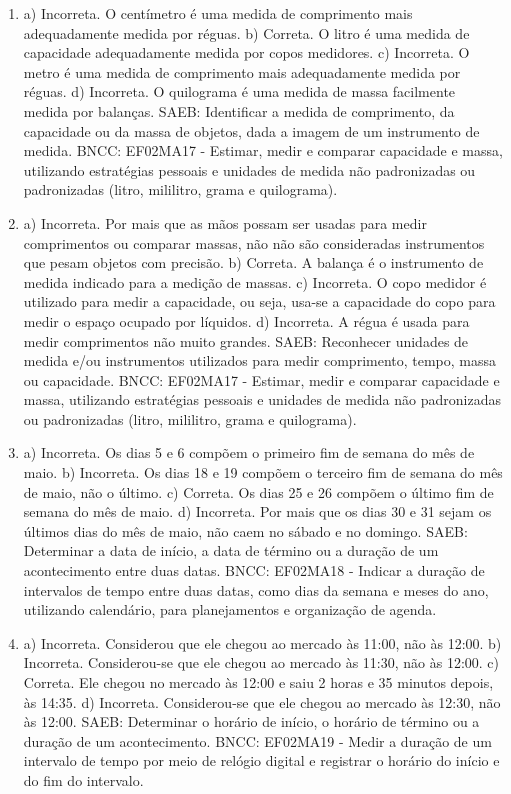 \begin{enumerate}
\item
a) Incorreta. O centímetro é uma medida de comprimento mais adequadamente medida por réguas.
b) Correta. O litro é uma medida de capacidade adequadamente medida por copos medidores.
c) Incorreta. O metro é uma medida de comprimento mais adequadamente medida por réguas.
d) Incorreta. O quilograma é uma medida de massa facilmente medida por balanças.
SAEB: Identificar a medida de comprimento, da capacidade ou da
massa de objetos, dada a imagem de um instrumento de medida.
BNCC: EF02MA17 - Estimar, medir e comparar capacidade
e massa, utilizando estratégias pessoais e unidades de medida não
padronizadas ou padronizadas (litro, mililitro, grama e quilograma).

\item
a) Incorreta. Por mais que as mãos possam ser usadas para medir
comprimentos ou comparar massas, não não são consideradas instrumentos que
pesam objetos com precisão.
b) Correta. A balança é o instrumento de medida indicado para a medição de massas.
c) Incorreta. O copo medidor é utilizado para medir a capacidade, ou
seja, usa-se a capacidade do copo para medir o espaço ocupado por líquidos.
d) Incorreta. A régua é usada para medir comprimentos não muito grandes.
SAEB: Reconhecer unidades de medida e/ou instrumentos utilizados
para medir comprimento, tempo, massa ou capacidade.
BNCC: EF02MA17 - Estimar, medir e comparar capacidade
e massa, utilizando estratégias pessoais e unidades de medida não
padronizadas ou padronizadas (litro, mililitro, grama e quilograma).

\item
a) Incorreta. Os dias 5 e 6 compõem o primeiro fim de semana do mês de maio.
b) Incorreta. Os dias 18 e 19 compõem o terceiro fim de semana do mês de maio, não o último.
c) Correta. Os dias 25 e 26 compõem o último fim de semana do mês de maio.
d) Incorreta. Por mais que os dias 30 e 31 sejam os últimos dias do mês de maio, não caem no sábado e no domingo.
SAEB: Determinar a data de início, a data de término ou a
duração de um acontecimento entre duas datas.
BNCC: EF02MA18 - Indicar a duração de intervalos de tempo entre
duas datas, como dias da semana e meses do ano, utilizando calendário,
para planejamentos e organização de agenda.

\item
a) Incorreta. Considerou que ele chegou ao mercado às 11:00, não às 12:00.
b) Incorreta. Considerou-se que ele chegou ao mercado às 11:30, não às 12:00.
c) Correta. Ele chegou no mercado às 12:00 e saiu 2 horas e 35 minutos depois, às 14:35.
d) Incorreta. Considerou-se que ele chegou ao mercado às 12:30, não às 12:00.
SAEB: Determinar o horário de início, o horário de término ou a
duração de um acontecimento.
BNCC: EF02MA19 - Medir a duração de um intervalo de tempo por meio de
relógio digital e registrar o horário do início e do fim do intervalo.


\end{enumerate}
